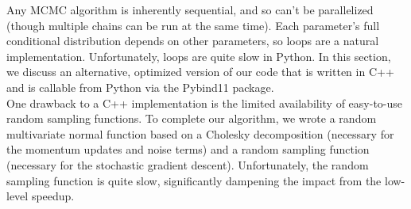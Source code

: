 Any MCMC algorithm is inherently sequential, and so can't be parallelized (though multiple chains can be run at the same time). Each parameter's full conditional distribution depends on other parameters, so loops are a natural implementation. Unfortunately, loops are quite slow in Python. In this section, we discuss an alternative, optimized version of our code that is written in C++ and is callable from Python via the Pybind11 package.\\

One drawback to a C++ implementation is the limited availability of easy-to-use random sampling functions. To complete our algorithm, we wrote a random multivariate normal function based on a Cholesky decomposition (necessary for the momentum updates and noise terms) and a random sampling function (necessary for the stochastic gradient descent). Unfortunately, the random sampling function is quite slow, significantly dampening the impact from the low-level speedup. 
